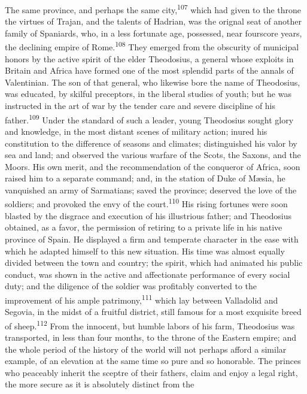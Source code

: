 The same province, and perhaps the same city,\textsuperscript{107} which had given
to the throne the virtues of Trajan, and the talents of Hadrian,
was the orignal seat of another family of Spaniards, who, in a
less fortunate age, possessed, near fourscore years, the
declining empire of Rome.\textsuperscript{108} They emerged from the obscurity of
municipal honors by the active spirit of the elder Theodosius, a
general whose exploits in Britain and Africa have formed one of
the most splendid parts of the annals of Valentinian. The son of
that general, who likewise bore the name of Theodosius, was
educated, by skilful preceptors, in the liberal studies of youth;
but he was instructed in the art of war by the tender care and
severe discipline of his father.\textsuperscript{109} Under the standard of such a
leader, young Theodosius sought glory and knowledge, in the most
distant scenes of military action; inured his constitution to the
difference of seasons and climates; distinguished his valor by
sea and land; and observed the various warfare of the Scots, the
Saxons, and the Moors. His own merit, and the recommendation of
the conqueror of Africa, soon raised him to a separate command;
and, in the station of Duke of Mæsia, he vanquished an army of
Sarmatians; saved the province; deserved the love of the
soldiers; and provoked the envy of the court.\textsuperscript{110} His rising
fortunes were soon blasted by the disgrace and execution of his
illustrious father; and Theodosius obtained, as a favor, the
permission of retiring to a private life in his native province
of Spain. He displayed a firm and temperate character in the ease
with which he adapted himself to this new situation. His time was
almost equally divided between the town and country; the spirit,
which had animated his public conduct, was shown in the active
and affectionate performance of every social duty; and the
diligence of the soldier was profitably converted to the
improvement of his ample patrimony,\textsuperscript{111} which lay between
Valladolid and Segovia, in the midst of a fruitful district,
still famous for a most exquisite breed of sheep.\textsuperscript{112} From the
innocent, but humble labors of his farm, Theodosius was
transported, in less than four months, to the throne of the
Eastern empire; and the whole period of the history of the world
will not perhaps afford a similar example, of an elevation at the
same time so pure and so honorable. The princes who peaceably
inherit the sceptre of their fathers, claim and enjoy a legal
right, the more secure as it is absolutely distinct from the
